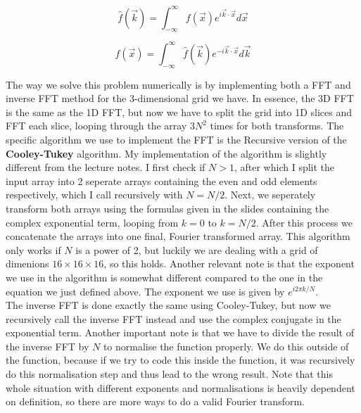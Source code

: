 \begin{equation}
\hat{f}(\vec{k}) = \int_{-\infty}^{\infty} f(\vec{x}) e^{i \vec{k} \cdot \vec{x}}d\vec{x} 
\end{equation}

\begin{equation}
f(\vec{x}) = \int_{-\infty}^{\infty} \hat{f}(\vec{k}) e^{-i \vec{k} \cdot \vec{x}}d\vec{k} 
\end{equation}

The way we solve this problem numerically is by implementing both a FFT and inverse FFT method for the 3-dimensional grid we have. In essence, the 3D FFT is the same as the 1D FFT, but now we have to split the grid into 1D slices and FFT each slice, looping through the array $3N^2$ times for both transforms. The specific algorithm we use to implement the FFT is the Recursive version of the \textbf{Cooley-Tukey} algorithm. My implementation of the algorithm is slightly different from the lecture notes. I first check if $N>1$, after which I split the input array into 2 seperate arrays containing the even and odd elements respectively, which I call recursively with $N = N/2$. Next, we seperately transform both arrays using the formulas given in the slides containing the complex exponential term, looping from $k=0$ to $k = N/2$. After this process we concatenate the arrays into one final, Fourier transformed array. This algorithm only works if $N$ is a power of 2, but luckily we are dealing with a grid of dimenions $16 \times 16 \times 16$, so this holds. Another relevant note is that the exponent we use in the algorithm is somewhat different compared to the one in the equation we just defined above. The exponent we use is given by $e^{i 2\pi k/N}$.\\

The inverse FFT is done exactly the same using Cooley-Tukey, but now we recursively call the inverse FFT instead and use the complex conjugate in the exponential term. Another important note is that we have to divide the result of the inverse FFT by $N$ to normalise the function properly. We do this outside of the function, because if we try to code this inside the function, it was recursively do this normalisation step and thus lead to the wrong result. Note that this whole situation with different exponents and normalisations is heavily dependent on definition, so there are  more ways to do a valid Fourier transform.\\

